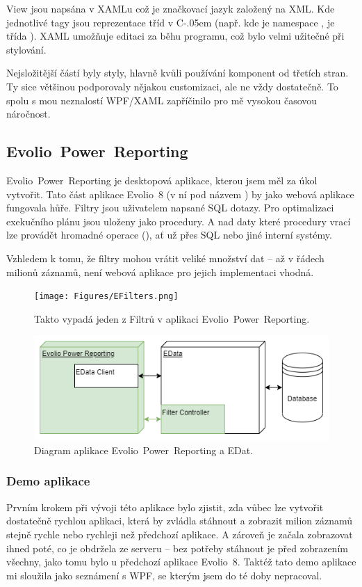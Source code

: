 \documentclass[czech,bachelor,dept460,male,csharp]{diploma}
\newcommand{\EvolioEight}{Evolio~8}
\newcommand{\EFilters}{Evolio~Power~Reporting}
\newcommand{\Csharp}{%
  {\settoheight{\dimen0}{C}C\kern-.05em \resizebox{!}{\dimen0}{\raisebox{\depth}{\#}}}}
\begin{document}
			View jsou napsána v XAMLu což je značkovací jazyk založený na XML. Kde jednotlivé tagy jsou reprezentace tříd v {\Csharp} (např.  kde  je namespace , je třída  ). XAML umožňuje editaci za běhu programu, což bylo velmi užitečné při stylování. 
			
			Nejsložitější částí byly styly, hlavně kvůli používání komponent od třetích stran. Ty sice většinou podporovaly nějakou customizaci, ale ne vždy dostatečně. To spolu s mou neznalostí WPF/XAML zapříčinilo pro mě vysokou časovou náročnost.
	\subsection{\EFilters}
		{\EFilters} je desktopová aplikace, kterou jsem měl za úkol vytvořit. Tato část aplikace {\EvolioEight} (v ní pod názvem ) by jako webová aplikace fungovala hůře.
		Filtry jsou uživatelem napsané SQL dotazy. Pro optimalizaci exekučního plánu jsou uloženy jako procedury. A nad daty které procedury vrací lze provádět hromadné operace (), ať už přes SQL nebo jiné interní systémy.
		
		Vzhledem k tomu, že filtry mohou vrátit veliké množství dat – až v řádech milionů záznamů, není webová aplikace pro jejich implementaci vhodná.
			
			\begin{figure}[h!]
				\texttt{[image: Figures/EFilters.png]}
				\caption{Takto vypadá jeden z Filtrů v aplikaci {\EFilters}.}
    			\label{fig:EFilters}
			\end{figure}
			
			\begin{figure}[h]
				\includegraphics[width=1.0\textwidth]{Figures/EfiltersDiagram.png}
				\caption{Diagram aplikace {\EFilters} a EDat.}
    			\label{fig:EFiltersDiagram}
			\end{figure}
		\subsubsection{Demo aplikace}
			Prvním krokem při vývoji této aplikace bylo zjistit, zda vůbec lze vytvořit dostatečně rychlou aplikaci, která by zvládla stáhnout a zobrazit milion záznamů stejně rychle nebo rychleji než předchozí aplikace. A zároveň je začala zobrazovat ihned poté, co je obdržela ze serveru – bez potřeby stáhnout je před zobrazením všechny, jako tomu bylo u předchozí aplikace {\EvolioEight}.
			Taktéž tato demo aplikace mi sloužila jako seznámení s WPF, se kterým jsem do té doby nepracoval.
\end{document}
